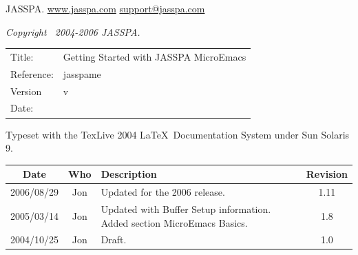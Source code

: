 \documentclass[11pt,a4paper,pdftex]{article}
\newcommand{\docTitle}{Getting Started with JASSPA MicroEmacs}
\newcommand{\docDate}{\CVSDate}
\newcommand{\docVersion}{\CVSRevision}
\newcommand{\docReference}{jasspame}
\newcommand{\tableTitle}[1]{\textbf{#1}}%
\begin{document}
\newpage
\setlength{\parindent}{0pt}
\setlength{\parskip}{0.5ex}
\pagestyle{fancy}

\begin{small}
\vspace{.5in}
JASSPA.
\href{http://www.jasspa.com}{www.jasspa.com}\newline
\href{mailto:support@jasspa.com}{support@jasspa.com}\newline

\vspace{0.5in}

\textit{Copyright \textcopyright\ 2004-2006 JASSPA.}


\vspace{0.5in}

\begin{table}[ht]
  \begin{tabular}{ll}
    Title:        & \docTitle \\
    Reference:    & \docReference \\
    Version       & v\docVersion \\
    Date:         & \docDate \\
  \end{tabular}
\end{table}

Typeset with the TexLive 2004 \LaTeX\ Documentation System under Sun Solaris
9.

\vspace{0.5in}

\begin{center}
  \begin{table}[ht]
    \begin{tabular}{|c|c|p{4in}|c|}
    \hline
    \tableTitle{Date} & \tableTitle{Who} & \tableTitle{Description} & \tableTitle{Revision} \\
    \hline
    2006/08/29 & Jon & Updated for the 2006 release. & 1.11\\ \hline
    2005/03/14 & Jon & Updated with Buffer Setup information.
                       Added section MicroEmacs Basics. & 1.8\\ \hline
    2004/10/25 & Jon & Draft. & 1.0 \\ \hline
    \end{tabular}
  \end{table}
\end{center}
\end{small}
\end{document}
